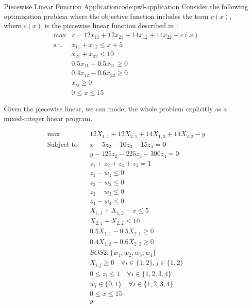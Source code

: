 \documentclass[../open-optimization/open-optimization.tex]{subfiles}
\begin{document}
\begin{examplewithcode}{Piecewise Linear Function Application}{code:pwl-application}
\label{example:pwl-application}
Consider the following optimization problem where the objective function includes the term $c(x)$, where $c(x)$ is the piecewise linear function described in :
$$
\begin{array}{cc}
\max & z = 12x_{11} + 12x_{21} + 14x_{12} + 14x_{22} - c(x)\\
\text{s.t.} & x_{11} + x_{12} \leq x + 5\\
& x_{21} + x_{22} \leq 10\\
& 0.5 x_{11} - 0.5x_{21} \geq 0\\
& 0.4 x_{12} - 0.6 x_{22} \geq 0\\
& x_{ij} \geq 0\\
& 0 \leq x \leq 15
\end{array}
$$

Given the piecewise linear, we can model the whole problem explicitly as a mixed-integer linear program.

 \begin{align*}
 \max\quad & 12 X_{1,1} + 12 X_{2,1} + 14 X_{1,2} + 14 X_{2,2} - y\\
\text{Subject to} \quad & x - 5 z_{2} - 10 z_{3} - 15 z_{4} = 0\\
 & y - 125 z_{2} - 225 z_{3} - 300 z_{4} = 0\\
 & z_{1} + z_{2} + z_{3} + z_{4} = 1\\
 & z_{1} - w_{1} \leq 0\\
 & z_{2} - w_{2} \leq 0\\
 & z_{3} - w_{3} \leq 0\\
 & z_{4} - w_{4} \leq 0\\
 & X_{1,1} + X_{1,2} - x \leq 5\\
 & X_{2,1} + X_{2,2} \leq 10\\
 & 0.5 X_{1,1} - 0.5 X_{2,1} \geq 0\\
 & 0.4 X_{1,2} - 0.6 X_{2,2} \geq 0\\
 & SOS2: \{w_1, w_2, w_3, w_4\}\\
 & X_{i,j} \geq 0 \quad\forall i \in \{1,2\}, j \in \{1,2\}\\
 & 0 \leq z_{i} \leq 1 \quad\forall i \in \{1,2,3,4\}\\
 & w_{i} \in \{0,1\} \quad\forall i \in \{1,2,3,4\}\\
 & 0 \leq x \leq 15\\
 & y\\
\end{align*}

\end{examplewithcode}
\end{document}
